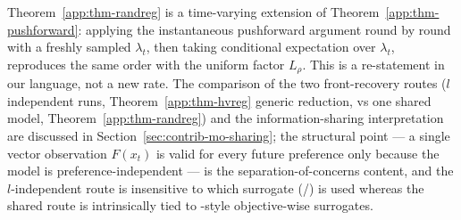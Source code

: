 \begin{remark}
Theorem~\ref{app:thm-randreg} is a time-varying extension of
Theorem~\ref{app:thm-pushforward}: applying the instantaneous pushforward argument
round by round with a freshly sampled $\lambda_t$, then taking conditional
expectation over $\lambda_t$, reproduces the same order with the uniform factor
$L_\rho$. This is a re-statement in our language, not a new rate. The comparison
of the two front-recovery routes ($l$ independent runs, Theorem~\ref{app:thm-hvreg}
generic reduction, vs one shared model, Theorem~\ref{app:thm-randreg}) and the
information-sharing interpretation are discussed in
Section~\ref{sec:contrib-mo-sharing}; the structural point --- a single vector
observation $F(x_t)$ is valid for every future preference only because the model
is preference-independent --- is the separation-of-concerns content, and the
$l$-independent route is insensitive to which surrogate (\RIGHT/\WRONG) is used
whereas the shared route is intrinsically tied to \RIGHT-style objective-wise
surrogates.
\end{remark}
